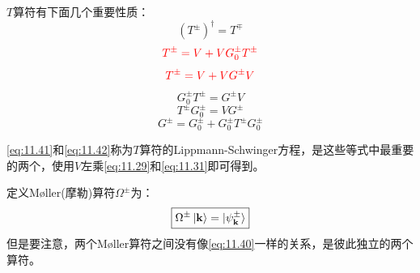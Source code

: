 \documentclass[a4paper,zihao=-4,linespread=1]{ctexrep}
\begin{document}
  	$T$算符有下面几个重要性质：
  	\begin{equation}
  		\label{eq:11.40}
  		(T^{\pm})^\dagger=T^{\mp}
  	\end{equation}
    \begin{equation}
    	\label{eq:11.41}
    	{\color{red}
    	T^{\pm}=V+VG_0^\pm T^\pm}
    \end{equation}
	\begin{equation}
		\label{eq:11.42}
		{\color{red}
		T^{\pm}=V+VG^\pm V}
	\end{equation}
	\begin{equation}
		\label{eq:11.43}
		G_0^\pm T^\pm=G^\pm V
	\end{equation}
	\begin{equation}
		\label{eq:11.44}
	T^\pm	G_0^\pm =VG^\pm 
	\end{equation}
	\begin{equation}
		G^\pm=G_0^\pm+G_0^\pm T^\pm G_0^\pm
	\end{equation}
	
	\ref{eq:11.41}和\ref{eq:11.42}称为$T$算符的Lippmann-Schwinger方程，是这些等式中最重要的两个，使用$V$左乘\ref{eq:11.29}和\ref{eq:11.31}即可得到。
	
	定义Møller(摩勒)算符$\Omega^{\pm}$为：
	\begin{equation}
		\boxed{\Omega^\pm\ket{\mathbf{k}}=\ket{\psi^\pm_{\mathbf{k}}}}
	\end{equation}
	但是要注意，两个Møller算符之间没有像\ref{eq:11.40}一样的关系，是彼此独立的两个算符。
	
\end{document}
